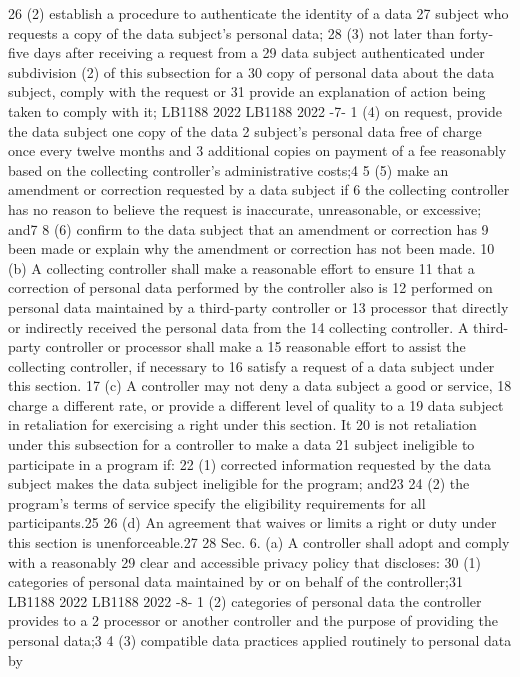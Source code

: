 26 (2) establish a procedure to authenticate the identity of a data
27 subject who requests a copy of the data subject's personal data;
28 (3) not later than forty-five days after receiving a request from a
29 data subject authenticated under subdivision (2) of this subsection for a
30 copy of personal data about the data subject, comply with the request or
31 provide an explanation of action being taken to comply with it;
LB1188
2022
LB1188
2022
-7-
1 (4) on request, provide the data subject one copy of the data
2 subject's personal data free of charge once every twelve months and
3 additional copies on payment of a fee reasonably based on the collecting
controller's administrative costs;4
5 (5) make an amendment or correction requested by a data subject if
6 the collecting controller has no reason to believe the request is
inaccurate, unreasonable, or excessive; and7
8 (6) confirm to the data subject that an amendment or correction has
9 been made or explain why the amendment or correction has not been made.
10 (b) A collecting controller shall make a reasonable effort to ensure
11 that a correction of personal data performed by the controller also is
12 performed on personal data maintained by a third-party controller or
13 processor that directly or indirectly received the personal data from the
14 collecting controller. A third-party controller or processor shall make a
15 reasonable effort to assist the collecting controller, if necessary to
16 satisfy a request of a data subject under this section.
17 (c) A controller may not deny a data subject a good or service,
18 charge a different rate, or provide a different level of quality to a
19 data subject in retaliation for exercising a right under this section. It
20 is not retaliation under this subsection for a controller to make a data
21 subject ineligible to participate in a program if:
22 (1) corrected information requested by the data subject makes the
data subject ineligible for the program; and23
24 (2) the program's terms of service specify the eligibility
requirements for all participants.25
26 (d) An agreement that waives or limits a right or duty under this
section is unenforceable.27
28 Sec. 6. (a) A controller shall adopt and comply with a reasonably
29 clear and accessible privacy policy that discloses:
30 (1) categories of personal data maintained by or on behalf of the
controller;31
LB1188
2022
LB1188
2022
-8-
1 (2) categories of personal data the controller provides to a
2 processor or another controller and the purpose of providing the personal
data;3
4 (3) compatible data practices applied routinely to personal data by
